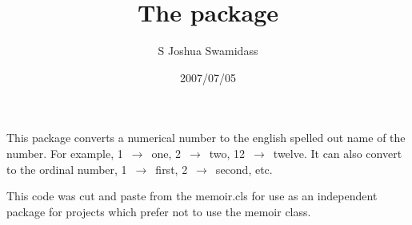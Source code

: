 \documentclass[pagesize=auto, parskip=full, fontsize=14pt, DIV=9]{scrartcl}
\title{The \pkg{numname} package}
\author{S Joshua Swamidass}
\date{2007/07/05}
\newcommand*{\cls}[1]{\textsf{#1}}
\begin{document}
\maketitle

This package converts a numerical number to the english spelled out 
name of the number. For example, 1~$\to$~one, 2~$\to$~two, 12~$\to$~twelve. It 
can also convert to the ordinal number, 1~$\to$~first, 2~$\to$~second, etc. 

This code was cut and paste from the \cls{memoir.cls} for use as an 
independent package for projects which prefer not to use the \cls{memoir} 
class.
\end{document}
